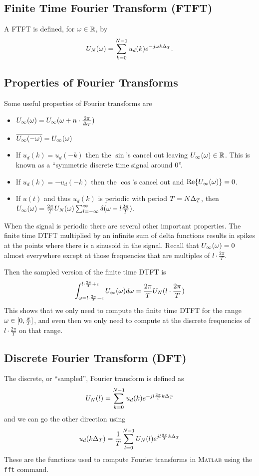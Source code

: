 \subsection{Finite Time Fourier Transform (FTFT)}
A FTFT is defined, for $\omega\in\mathbb{R}$, by
$$U_N(\omega) = \sum_{k=0}^{N-1} u_d(k) e^{-j\omega k\Delta_T}.$$

\subsection{Properties of Fourier Transforms}
Some useful properties of Fourier transforms are
\begin{itemize}
\item $U_\infty(\omega) = U_\infty(\omega + n\cdot \frac{2\pi}{\Delta_T})$
\item $\overline{U_\infty(-\omega)} = U_\infty(\omega)$
\item If $u_d(k) = u_d(-k)$ then the $\sin$'s cancel out leaving $U_\infty(\omega)\in\mathbb{R}$. This is known as a ``symmetric discrete time signal around $0$''.
\item If $u_d(k) = -u_d(-k)$ then the $\cos$'s cancel out and $\text{Re}\lbrace U_\infty(\omega)\rbrace = 0$.
\item If $u(t)$ and thus $u_d(k)$ is periodic with period $T=N\Delta_T$, then $U_\infty(\omega) = \frac{2\pi}{T}U_N(\omega) \sum_{l=-\infty}^\infty \delta(\omega-l\frac{2\pi}{T})$.
\end{itemize}
When the signal is periodic there are several other important properties. The finite time DTFT multiplied by an infinite sum of delta functions results in spikes at the points where there is a sinusoid in the signal. Recall that $U_\infty(\omega)=0$ almost everywhere except at those frequencies that are multiples of $l\cdot \frac{2\pi}{T}$.

Then the sampled version of the finite time DTFT is
$$\int_{\omega=l\cdot \frac{2\pi}{T}-\epsilon}^{l\cdot \frac{2\pi}{T}+\epsilon} U_\infty(\omega)d\omega
= \frac{2\pi}{T}U_N(l\cdot \frac{2\pi}{T})$$
This shows that we only need to compute the finite time DTFT for the range $\omega\in[0,\frac{\pi}{T}]$, and even then we only need to compute at the discrete frequencies of $l\cdot\frac{2\pi}{T}$ on that range.

\subsection{Discrete Fourier Transform (DFT)}
The discrete, or ``sampled'', Fourier transform is defined as
$$U_N(l) = \sum_{k=0}^{N-1} u_d(k) e^{-jl\frac{2\pi}{T}k\Delta_T}$$
and we can go the other direction using
$$u_d(k\Delta_T) = \frac{1}{T} \sum_{l=0}^{N-1} U_N(l) e^{jl\frac{2\pi}{T}k\Delta_T}$$
These are the functions used to compute Fourier transforms in \textsc{Matlab} using the \texttt{fft} command.

